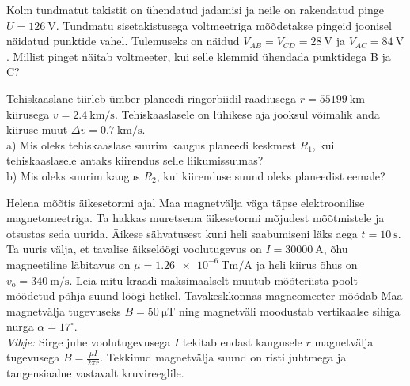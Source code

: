 \documentclass[10pt]{article}
\begin{document}
Kolm tundmatut takistit on ühendatud jadamisi ja neile on rakendatud pinge $U=\SI{126}{\volt}$. Tundmatu sisetakistusega voltmeetriga mõõdetakse pingeid joonisel näidatud punktide vahel. Tulemuseks on näidud $V_{AB}=V_{CD}=\SI{28}{\volt}$ ja $V_{AC}=\SI{84}{\volt}$. Millist pinget näitab voltmeeter, kui selle klemmid ühendada punktidega B ja C?
\probend
\bigskip


Tehiskaaslane tiirleb ümber planeedi ringorbiidil raadiusega $r=\SI{55199}{\km}$ kiirusega $v=\SI{2.4}{\km\per\s}$. Tehiskaaslasele on lühikese aja jooksul võimalik anda kiiruse muut $\Delta v=\SI{0.7}{\km\per\s}$.
\\a) Mis oleks tehiskaaslase suurim kaugus planeedi keskmest $R_1$, kui tehiskaaslasele antaks kiirendus selle liikumissuunas?
\\b) Mis oleks suurim kaugus $R_2$, kui kiirenduse suund oleks planeedist eemale?
\probend
\bigskip


Helena mõõtis äikesetormi ajal Maa magnetvälja väga täpse elektroonilise magnetomeetriga. Ta hakkas muretsema äikesetormi mõjudest mõõtmistele ja otsustas seda uurida. Äikese sähvatusest kuni heli saabumiseni läks aega $t = \SI{10}{\s}$. Ta uuris välja, et tavalise äikselöögi voolutugevus on $I = \SI{30000}{\ampere}$, õhu magneetiline läbitavus on $\mu = \SI{1.26e-6}{\tesla\metre\per\ampere}$ ja heli kiirus õhus on $v_{õ} = \SI{340}{\m\per\s}$. Leia mitu kraadi maksimaalselt muutub mõõteriista poolt mõõdetud põhja suund löögi hetkel. Tavakeskkonnas magneomeeter mõõdab Maa magnetvälja tugevuseks $B = \SI{50}{\micro \tesla}$ ning magnetväli moodustab vertikaalse sihiga nurga $\alpha = 17^{\circ}$. \\
\textit{Vihje:} Sirge juhe voolutugevusega $I$ tekitab endast kaugusele $r$ magnetvälja tugevusega $B = \frac{\mu I}{2\pi r}$. Tekkinud magnetvälja suund on risti juhtmega ja tangensiaalne vastavalt kruvireeglile.
\probend
\bigskip

\end{document}
